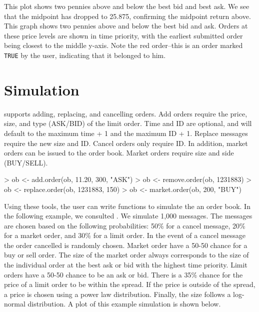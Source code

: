 This plot shows two pennies above and below the best bid and best
ask. We see that the midpoint has dropped to 25.875, confirming the
midpoint return above. This graph shows two pennies above and below
the best bid and ask. Orders at these price levels are shown in time
priority, with the earliest submitted order being closest to the
middle y-axis. Note the red order--this is an order marked
\texttt{TRUE} by the user, indicating that it belonged to him.

\section{Simulation}

 supports adding, replacing, and cancelling orders. Add
orders require the price, size, and type (ASK/BID) of the limit
order. Time and ID are optional, and will default to the maximum time
+ 1 and the maximum ID + 1. Replace messages require the new size and
ID. Cancel orders only require ID. In addition, market orders can be
issued to the order book. Market orders require size and side
(BUY/SELL).

\begin{Schunk}
\begin{Sinput}
> ob <- add.order(ob, 11.20, 300, "ASK")
> ob <- remove.order(ob, 1231883)
> ob <- replace.order(ob, 1231883, 150)
> ob <- market.order(ob, 200, "BUY")
\end{Sinput}
\end{Schunk}

Using these tools, the user can write functions to simulate the an
order book. In the following example, we consulted
\cite{gilles:daniel}. We simulate 1,000 messages.  The messages are
chosen based on the following probabilities: 50\% for a cancel
message, 20\% for a market order, and 30\% for a limit order. In the
event of a cancel message the order cancelled is randomly
chosen. Market order have a 50-50 chance for a buy or sell order. The
size of the market order always corresponds to the size of the
individual order at the best ask or bid with the highest time
priority. Limit orders have a 50-50 chance to be an ask or bid. There
is a 35\% chance for the price of a limit order to be within the
spread. If the price is outside of the spread, a price is chosen using
a power law distribution. Finally, the size follows a log-normal
distribution. A  plot of this example simulation is shown below.


